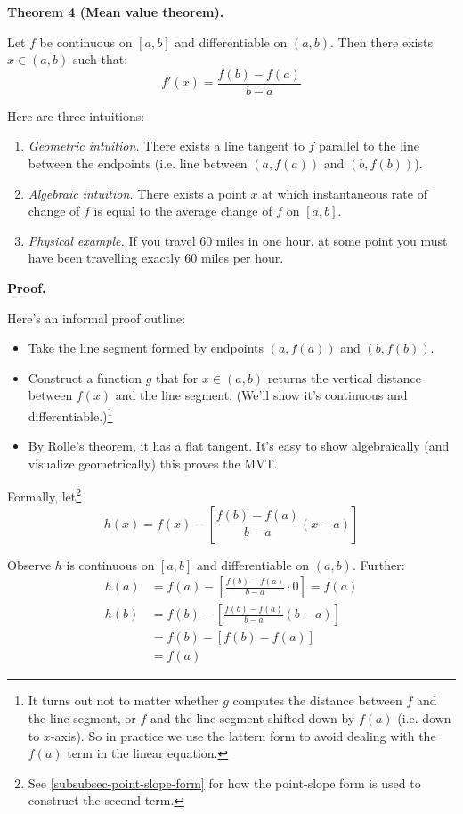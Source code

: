 \textbf{Theorem 4 (Mean value theorem).}

Let $f$ be continuous on $[a,b]$ and differentiable on $(a,b)$. Then
there exists $x\in(a,b)$ such that:
\[f'(x)=\frac{f(b)-f(a)}{b-a}\]

Here are three intuitions:
\begin{enumerate}
\item \textit{Geometric intuition.} There exists a line tangent to $f$
  parallel to the line between the endpoints (i.e. line between
  $(a, f(a))$ and $(b, f(b))$).
\item \textit{Algebraic intuition.} There exists a point $x$ at which
  instantaneous rate of change of $f$ is equal to the average change
  of $f$ on $[a,b]$.
\item \textit{Physical example.} If you travel 60 miles in one hour,
  at some point you must have been travelling exactly 60 miles per
  hour.
\end{enumerate}

\textbf{Proof.}

Here's an informal proof outline:
\begin{itemize}
\item Take the line segment formed by endpoints $(a,f(a))$ and
  $(b,f(b))$.
\item Construct a function $g$ that for $x\in(a,b)$ returns the vertical
  distance between $f(x)$ and the line segment. (We'll show it's
  continuous and differentiable.)\footnote{It turns out not to matter
    whether $g$ computes the distance between $f$ and the line
    segment, or $f$ and the line segment shifted down by $f(a)$ (i.e.
    down to $x$-axis). So in practice we use the lattern form to avoid
    dealing with the $f(a)$ term in the linear equation.}
\item By Rolle's theorem, it has a flat tangent. It's easy to show
  algebraically (and visualize geometrically) this proves the MVT.
\end{itemize}

Formally, let\footnote{See \ref{subsubsec-point-slope-form} for how
  the point-slope form is used to construct the second term.}
\[h(x)=f(x)-\left[\frac{f(b)-f(a)}{b-a}(x-a)\right]\]

Observe $h$ is continuous on $[a,b]$ and differentiable on $(a,b)$.
Further:
\begin{align*}
  h(a)&=f(a)-\left[\frac{f(b)-f(a)}{b-a}\cdot0\right]=f(a)\\
  h(b)&=f(b)-\left[\frac{f(b)-f(a)}{b-a}(b-a)\right]\\
      &=f(b)-[f(b)-f(a)]\\
      &=f(a)
\end{align*}

